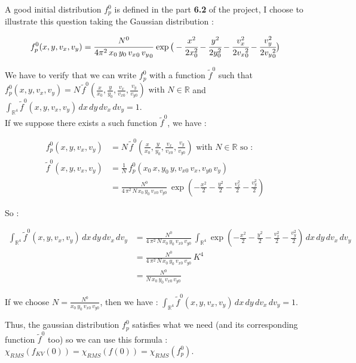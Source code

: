 \documentclass[10pt]{article}
\begin{document}
A good initial distribution $f_p^0$ is defined in the part \textbf{6.2} of the project, I choose to illustrate this question taking the Gaussian distribution :

$$f_{p}^{0}(x,y,v_{x},v_{y}) = \cfrac{N^{0}}{4\pi^{2}\,x_{0}\,y_{0}\,{v_{x}}_{0}\,{v_{y}}_{0}} \, \exp\big(-\cfrac{x^{2}}{2x_{0}^{2}} - \cfrac{y^{2}}{2y_{0}^{2}} - \cfrac{v_{x}^{2}}{2{v_{x}}_{0}^{2}} - \cfrac{v_{y}^{2}}{2{v_{y}}_{0}^{2}} \big)$$

We have to verify that we can write $f_p^0$ with a function $\tilde{f}^0$ such that $f_p^0(x,y,v_x,v_y) = N\,\tilde{f}^0\left(\frac{x}{x_0},\frac{y}{y_0}, \frac{v_x}{v_{x0}}, \frac{v_y}{v_{y0}}\right) \mbox{ with } N\in\mathbb{R}$ and $\int_{\mathbb{R}^4} \tilde{f}^0\left(x,y,v_x,v_y \right)\,dx\,dy\,dv_x\,dv_y = 1$.\\

If we suppose there exists a such function $\tilde{f}^0$, we have :

\begin{align*}
f_p^0(x,y,v_x,v_y) &= N\,\tilde{f}^0\left(\frac{x}{x_0},\frac{y}{y_0}, \frac{v_x}{v_{x0}}, \frac{v_y}{v_{y0}}\right) \mbox{ with } N\in\mathbb{R} \mbox{ so : }\\
\tilde{f}^0(x,y,v_x,v_y) &= \frac{1}{N}\,f_p^0\left(x_0\,x,y_0\,y, v_{x0}\,v_x, v_{y0}\,v_y\right) \\
&= \frac{N^0}{4\,\pi^{2}\,N\,x_0\,y_0\,v_{x0}\,v_{y0}}\,\exp\left(-\frac{x^2}{2}-\frac{y^2}{2}-\frac{v_x^2}{2}-\frac{v_y^2}{2}\right)
\end{align*} 

So :

\begin{align*}
\int_{\mathbb{R}^4}\tilde{f}^0(x,y,v_x,v_y)\,dx\,dy\,dv_x\,dv_y &= \frac{N^0}{4\,\pi^{2}\,N\,x_0\,y_0\,v_{x0}\,v_{y0}}\,\int_{\mathbb{R}^4}\exp\left(-\frac{x^2}{2}-\frac{y^2}{2}-\frac{v_x^2}{2}-\frac{v_y^2}{2}\right)\,dx\,dy\,dv_x\,dv_y \\
&= \frac{N^0}{4\,\pi^{2}\,N\,x_0\,y_0\,v_{x0}\,v_{y0}}\,K^4 \\
&= \frac{N^0}{N\,x_0\,y_0\,v_{x0}\,v_{y0}}
\end{align*}

If we choose $N = \frac{N^0}{x_0\,y_0\,v_{x0}\,v_{y0}}$, then we have : $\int_{\mathbb{R}^4} \tilde{f}^0\left(x,y,v_x,v_y \right)\,dx\,dy\,dv_x\,dv_y = 1$. 


Thus, the gaussian distribution $f_p^0$ satisfies what we need (and its corresponding function $\tilde{f}^0$ too) so we can use this formula :
$\chi_{RMS}(f_{KV}(0)) = \chi_{RMS}(f(0)) = \chi_{RMS}\left(f_p^0\right)$. \\
\end{document}
